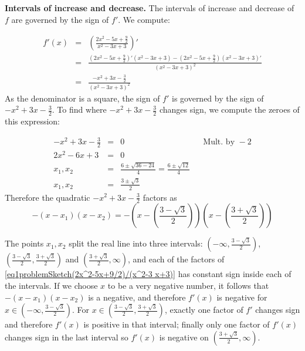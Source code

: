 {\textbf{Intervals of increase and decrease.}
The intervals of increase and decrease of $f$ are governed by the sign of $f'$. We compute:

\[
\begin{array}{rcl}
f'(x)&=&\displaystyle \left(\frac{2x^2-5x+\frac{9}{2} }{x^2- 3 x+3} \right)' \\
&=&\displaystyle \frac{\left(2x^2-5x+\frac{9}{2}\right)'\left(x^2- 3 x+3\right)-\left(2x^2-5x+\frac{9}{2}\right)\left(x^2- 3 x+3\right)' }{ \left(x^2- 3 x+3\right)^2}\\
&=&\displaystyle \frac{- x^{2}+3 x-\frac{3}{2} }{ \left(x^2- 3 x+3\right)^2}
\end{array}
\]
As the denominator is a square, the sign of $f'$ is governed by the sign of $- x^{2}+3 x-\frac{3}{2}$. To find where $- x^{2}+3 x-\frac{3}{2}$ changes sign, we compute the zeroes of this expression:

\[
\begin{array}{rcll|l}
\displaystyle - x^{2}+3 x-\frac{3}{2}&=&0&& \text{Mult. by }-2\\
\displaystyle  2x^{2}-6 x+3&=&0\\
x_1, x_2&=&\displaystyle \frac{ 6\pm \sqrt{36-24 }}{4}=\frac{6\pm \sqrt{12}}{4}\\
x_1, x_2&=&\displaystyle \frac{3\pm \sqrt{3}}{2} 
\end{array}
\]
Therefore the quadratic $- x^{2}+3 x-\frac{3}{2}$ factors as 
\begin{equation}
\label{eq1problemSketch(2x^2-5x+9/2)/(x^2-3 x+3)}
-(x-x_1)(x-x_2)=-\left(x-\left(\frac{3- \sqrt{3}}{2} \right)\right)\left(x-\left(\frac{3+ \sqrt{3}}{2}\right)\right)
\end{equation} 

The points $x_1, x_2$ split the real line into three intervals: $\left(-\infty, \frac{3- \sqrt{3}}{2}\right)$, $\left(\frac{3- \sqrt{3}}{2}, \frac{3+ \sqrt{3}}{2} \right)$ and $\left(\frac{3+ \sqrt{3}}{2}, \infty \right)$, and each of the factors of \eqref{eq1problemSketch(2x^2-5x+9/2)/(x^2-3 x+3)} has constant sign inside each of the intervals. If we choose $x$ to be a very negative number, it follows that $-(x-x_1)(x-x_2)$ is a negative, and therefore $ f'(x)$ is negative for $x\in(-\infty, \frac{3- \sqrt{3}}{2})$. For $x\in (\frac{3- \sqrt{3}}{2}, \frac{3+ \sqrt{3}}{2})$, exactly one factor of $f'$ changes sign and therefore $f'(x)$ is positive in that interval; finally only one factor of $f'(x)$ changes sign in the last interval so $f'(x)$ is negative on $(\frac{3+ \sqrt{3}}{2}, \infty )$.

}
